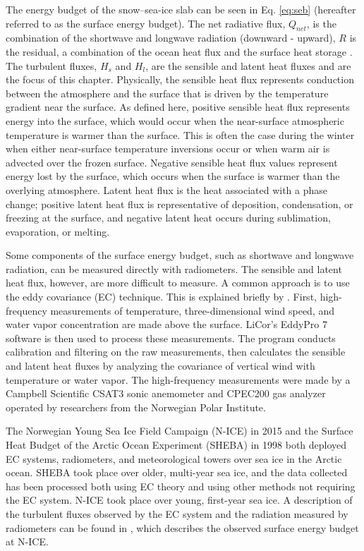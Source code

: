 The energy budget of the snow--sea-ice slab can be seen in Eq. \ref{eq:seb} (hereafter referred to as the surface energy budget). The net radiative flux, $Q_{net}$, is the combination of the shortwave and longwave radiation (downward - upward), $R$ is the residual, a combination of the ocean heat flux and the surface heat storage \citep{walden:2017}. The turbulent fluxes, $H_{s}$ and $H_{l}$, are the sensible and latent heat fluxes and are the focus of this chapter. Physically, the sensible heat flux represents conduction between the atmosphere and the surface that is driven by the temperature gradient near the surface. As defined here, positive sensible heat flux represents energy into the surface, which would occur when the near-surface atmospheric temperature is warmer than the surface. This is often the case during the winter when either near-surface temperature inversions occur or when warm air is advected over the frozen surface. Negative sensible heat flux values represent energy lost by the surface, which occurs when the surface is warmer than the overlying atmosphere. Latent heat flux is the heat associated with a phase change; positive latent heat flux is representative of deposition, condensation, or freezing at the surface, and negative latent heat occurs during sublimation, evaporation, or melting.

Some components of the surface energy budget, such as shortwave and longwave radiation, can be measured directly with radiometers. The sensible and latent heat flux, however, are more difficult to measure. A common approach is to use the eddy covariance (EC) technique. This is explained briefly by \citet{walden:2017}. First, high-frequency measurements of temperature, three-dimensional wind speed, and water vapor concentration are made above the surface. LiCor's EddyPro 7 \citep{epro} software is then used to process these measurements. The program conducts calibration and filtering on the raw measurements, then calculates the sensible and latent heat fluxes by analyzing the covariance of vertical wind with temperature or water vapor. The high-frequency measurements were made by a Campbell Scientific CSAT3 sonic anemometer and CPEC200 gas analyzer operated by researchers from the Norwegian Polar Institute. 

The Norwegian Young Sea Ice Field Campaign (N-ICE) in 2015 and the Surface Heat Budget of the Arctic Ocean Experiment (SHEBA) in 1998 both deployed EC systems, radiometers, and meteorological towers over sea ice in the Arctic ocean. SHEBA took place over older, multi-year sea ice, and the data collected has been processed both using EC theory and using other methods not requiring the EC system. N-ICE took place over young, first-year sea ice. A description of the turbulent fluxes observed by the EC system and the radiation measured by radiometers can be found in \citet{walden:2017}, which describes the observed surface energy budget at N-ICE. 

